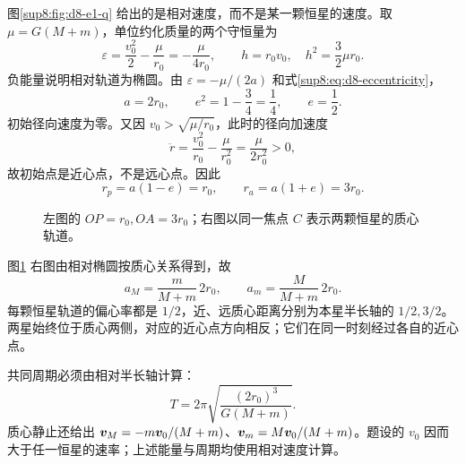 \begin{solution}
图\ref{sup8:fig:d8-e1-q} 给出的是相对速度，而不是某一颗恒星的速度。取 $\mu=G(M+m)$，单位约化质量的两个守恒量为
\[
 \varepsilon=\frac{v_0^2}2-\frac{\mu}{r_0}=-\frac{\mu}{4r_0},\qquad
 h=r_0v_0,\quad h^2=\frac32\mu r_0.
\]
负能量说明相对轨道为椭圆。由 $\varepsilon=-\mu/(2a)$ 和式\eqref{sup8:eq:d8-eccentricity}，
\[
 a=2r_0,\qquad e^2=1-\frac34=\frac14,\qquad e=\frac12.
\]
初始径向速度为零。又因 $v_0>\sqrt{\mu/r_0}$，此时的径向加速度
\[
 \ddot r=\frac{v_0^2}{r_0}-\frac{\mu}{r_0^2}=\frac{\mu}{2r_0^2}>0,
\]
故初始点是近心点，不是远心点。因此
\[
 r_p=a(1-e)=r_0,\qquad r_a=a(1+e)=3r_0.
\]
\begin{figure}[H]\centering
{}
\caption{左图的 $OP=r_0,OA=3r_0$；右图以同一焦点 $C$ 表示两颗恒星的质心轨道。}\label{sup8:fig:d8-e1-s}
\end{figure}
图\ref{sup8:fig:d8-e1-s} 右图由相对椭圆按质心关系得到，故
\[
 a_M=\frac{m}{M+m}\,2r_0,\qquad
 a_m=\frac{M}{M+m}\,2r_0.
\]
每颗恒星轨道的偏心率都是 $1/2$，近、远质心距离分别为本星半长轴的 $1/2,3/2$。两星始终位于质心两侧，对应的近心点方向相反；它们在同一时刻经过各自的近心点。

共同周期必须由相对半长轴计算：
\[
 T=2\pi\sqrt{\frac{(2r_0)^3}{G(M+m)}}.
\]
质心静止还给出 $\bm{v}_M=-m\bm{v}_0/(M+m)$、$\bm{v}_m=M\bm{v}_0/(M+m)$。题设的 $v_0$ 因而大于任一恒星的速率；上述能量与周期均使用相对速度计算。
\end{solution}



